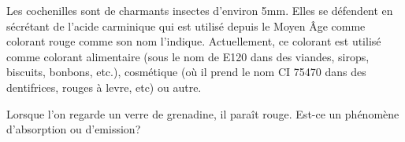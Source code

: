 Les cochenilles sont de charmants insectes d'environ 5mm.
Elles se défendent en sécrétant de l'acide carminique qui est utilisé depuis le Moyen Âge comme colorant
rouge comme son nom l'indique.
Actuellement, ce colorant est utilisé comme colorant alimentaire (sous le nom de E120 dans des viandes, sirops, biscuits, bonbons, etc.), cosmétique (où il prend le nom CI 75470 dans des dentifrices, rouges à levre, etc) ou autre.

	      Lorsque l'on regarde un verre de grenadine, il paraît rouge.
		Est-ce un phénomène d'absorption ou d'emission?

